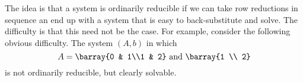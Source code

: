 The idea is that a system is ordinarily reducible if we can take row reductions in sequence an end up with a system that is easy to back-substitute and solve.
The difficulty is that this need not be the case.
For example, consider the following obvious difficulty.
The system $(A, b)$ in which
\[
	A = \barray{0 & 1\\1 & 2} \text{ and } \barray{1 \\ 2}
\]
is not ordinarily reducible, but clearly solvable.
